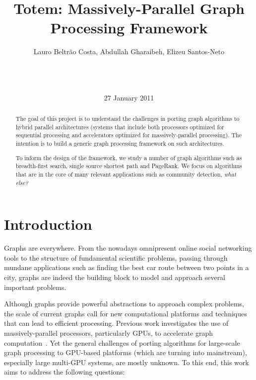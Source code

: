 \documentclass{acm_proc_article-sp}[12pt]
\title{Totem: Massively-Parallel Graph Processing Framework}
\author{
\alignauthor 
Lauro Beltr\~ao Costa, Abdullah Gharaibeh, Elizeu
Santos-Neto\vspace{3mm}\\
       \affaddr{\small{University of British Columbia}}\\
       \affaddr{\small{2332 Main Mall}}\\
       \affaddr{\small{Vancouver, BC, CANADA}}\\
       \email{\small{\{lauroc,abdullah,elizeus\}@ece.ubc.ca}}
}
\date{27 January 2011}
\begin{document}
\maketitle
\begin{abstract}
The goal of this project is to understand the challenges in porting graph algorithms to hybrid parallel architectures (systems that include both processors optimized for sequential processing and accelerators optimized for massively-parallel processing). The intention is to build a generic graph processing framework on such architectures.

To inform the design of the framework, we study a number of graph algorithms such as breadth-first search, single source shortest path and PageRank. We focus on algorithms  that are in the core of many relevant applications such as community detection, \textit{what else?}

\end{abstract}


\section{Introduction}

Graphs are everywhere. From the nowadays omnipresent online social networking tools to the structure of fundamental scientific problems, passing through mundane applications such as finding the best car route between two points in a city, graphs are indeed the building block to model and approach several important problems.

Although graphs provide powerful abstractions to approach complex problems, the scale of current graphs call for new computational platforms and techniques that can lead to efficient processing. Previous work investigates the use of massively-parallel processors, particularly GPUs, to accelerate graph computation~\cite{Harish2007, Katz2008, Sungpack2010, dehne2010exploring}. Yet the general challenges of porting algorithms for large-scale graph processing to GPU-based platforms (which are turning into mainstream), especially large multi-GPU systems, are mostly unknown. To this end, this work aims to address the following questions:
\end{document}
